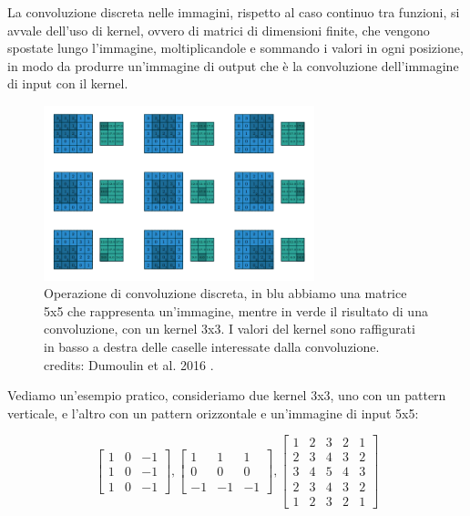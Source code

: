 La convoluzione discreta nelle immagini, rispetto al caso continuo tra funzioni, si avvale dell'uso di kernel, ovvero di matrici di dimensioni
finite, che vengono spostate lungo l'immagine, moltiplicandole e sommando i valori in ogni posizione, in modo da produrre un'immagine di output che è
la convoluzione dell'immagine di input con il kernel.


\begin{figure}[h]
    \hspace{-5.5cm}
    \centering
    \includegraphics[width=0.7\textwidth]{imgs/kernel_convolution.png}
    \caption{Operazione di convoluzione discreta, in blu abbiamo una matrice 5x5 che rappresenta un'immagine, mentre in verde il risultato di una convoluzione,
    con un kernel 3x3. I valori del kernel sono raffigurati in basso a destra delle caselle interessate dalla convoluzione.\\
    credits: Dumoulin et al. 2016 \cite{dumoulin2016guide}.}
    \label{fig:convolution_schematic}
\end{figure} 

\hspace{0cm}
Vediamo un'esempio pratico, consideriamo due kernel 3x3, uno con un pattern verticale, e l'altro con un pattern orizzontale e un'immagine di input 5x5:

\hspace{0cm}
\begin{equation}
    \label{eq:kernel_v_det_example}
    \begin{bmatrix}
        1 & 0 & -1 \\
        1 & 0 & -1 \\
        1 & 0 & -1
    \end{bmatrix} , 
    \begin{bmatrix}
        1 & 1 & 1 \\
        0 & 0 & 0 \\
        -1 & -1 & -1
    \end{bmatrix} ,
    \begin{bmatrix}
        1 & 2 & 3 & 2 & 1 \\
        2 & 3 & 4 & 3 & 2 \\
        3 & 4 & 5 & 4 & 3 \\
        2 & 3 & 4 & 3 & 2 \\
        1 & 2 & 3 & 2 & 1
    \end{bmatrix}
\end{equation}


